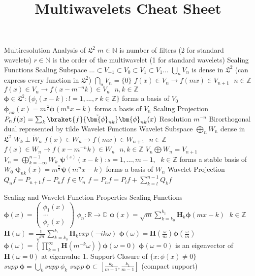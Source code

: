 \documentclass[14pt]{extarticle}
\title{Multiwavelets Cheat Sheet}
\begin{document}
	\maketitle

	\begin{outline}		
		\1	Multiresolution Analysis of $\mathfrak{L}^2$
			\2	$m \in \mathbb{N}$ is number of filters (2 for standard wavelets)
			\2	$r \in \mathbb{N}$ is the order of the multiwavelet (1 for standard wavelets)
			\2	Scaling Functions	
				\3	Scaling Subspace	
					\4	$... \subset V_{-1} \subset V_0 \subset V_1 \subset V_1...$
					\4	$\bigcup_n V_n$ is dense in $\mathfrak{L}^2$ (can express every function in $\mathfrak{L}^2$)
					\4	$\bigcap_n V_n = \{0\}$
					\4	$f(x) \in V_n \rightarrow f(mx) \in V_{n+1}~~~n \in \mathbb{Z}$
					\4	$f(x) \in V_n \rightarrow f(x - m^{-n}k) \in V_n~~~n,k \in \mathbb{Z}$
				\3	$\bm{\phi} \in \mathfrak{L}^2 : \{\phi_l(x-k) : l = 1,...,r~k \in \mathbb{Z}\}$ forms a basis of $V_0$
				\3	$\bm{\phi}_{nk}(x) = m^{\frac{n}{2}}\bm{\phi}(m^nx - k)$ forms a basis of $V_n$
				\3	Scaling Projection 
					\4	$P_nf(x) = \sum_k \braket{f}{\tilde{\bm{\phi}}_{nk}}\bm{\phi}_{nk}(x)$
					\4	Resolution $m^{-n}$
					\4	Birorthogonal dual represented by tilde	
			\2	Wavelet Functions
				\3	Wavelet Subspace
					\4	$\bigoplus_n W_n$ dense in $\mathfrak{L}^2$
					\4	$W_k \perp \tilde{W}_n$
					\4	$f(x) \in W_n \rightarrow f(mx) \in W_{n+1}~~~n\in \mathbb{Z}$
					\4	$f(x) \in W_n \rightarrow f(x - m^{-n}k) \in W_n~~~n,k \in \mathbb{Z}$
					\4	$V_n \bigoplus W_n = V_{n+1}$
					\4	$V_{n} = \bigoplus_{k=-\infty}^{n-1} W_k$
				\3	$\bm{\psi}^{(s)}(x - k) : s = 1,...,m-1,~~~k \in \mathbb{Z}$ forms a stable basis of $W_0$
				\3	$\bm{\psi}_{nk}(x) = m^{\frac{n}{2}}\bm{\psi}(m^nx - k)$ forms a basis of $W_n$
				\3	Wavelet Projection
					\4	$Q_nf = P_{n+1}f - P_nf$
					\4	$f \in V_n$
					\4	$f = P_nf = P_lf + \sum_{k=l}^{n-1}Q_kf$
		
		\1	Scaling and Wavelet Function Properties
			\2	Scaling Functions
				\3	$\bm{\phi}(x) = \begin{pmatrix} \phi_1(x) \\ ... \\ \phi_r(x)\end{pmatrix}$
				\3	$\phi_n : \mathbb{R} \rightarrow \mathbb{C}$
				\3	$\bm{\phi}(x) = \sqrt{m} \sum_{k = k_0}^{k_1} \bm{H}_k \bm{\phi}(mx - k)~~~k\in \mathbb{Z}$
					\4	$\bm{H}(\omega) = \frac{1}{\sqrt{m}}\sum_{k=k_0}^{k_1}\bm{H}_k exp(-ik\omega)$
					\4	$\bm{\phi}(\omega) = \bm{H}(\frac{\omega}{m})\bm{\phi}(\frac{\omega}{m})$
					\4	$\bm{\phi}(\omega) = (\prod_{k=1}^{\infty} \bm{H}(m^{-k}\omega))\bm{\phi}(\omega = 0)$
					\4	$\bm{\phi}(\omega = 0)$ is an eigenvector of $\bm{H}(\omega = 0)$ at eigenvalue 1.	
				\3	Support
					\4	Closure of $\{x : \phi(x) \ne 0\}$
					\4	$supp~\bm{\phi} = \bigcup_k supp~\phi_k$
					\4	$supp~\bm{\phi} \subset [\frac{k_0}{m-1},\frac{k_1}{m-1}]$ (compact support)
			

\end{outline}
\end{document}
